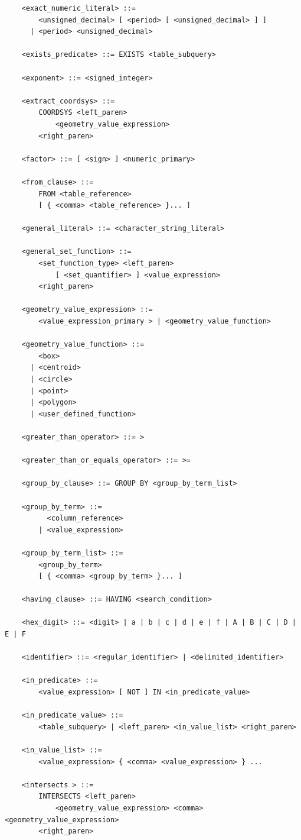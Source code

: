 \documentclass[11pt,a4paper]{ivoa}
\begin{document}
\begin{verbatim}
    <exact_numeric_literal> ::=
        <unsigned_decimal> [ <period> [ <unsigned_decimal> ] ]
      | <period> <unsigned_decimal>

    <exists_predicate> ::= EXISTS <table_subquery>

    <exponent> ::= <signed_integer>

    <extract_coordsys> ::=
        COORDSYS <left_paren>
            <geometry_value_expression>
        <right_paren>

    <factor> ::= [ <sign> ] <numeric_primary>

    <from_clause> ::=
        FROM <table_reference>
	    [ { <comma> <table_reference> }... ]

    <general_literal> ::= <character_string_literal>

    <general_set_function> ::=
        <set_function_type> <left_paren>
            [ <set_quantifier> ] <value_expression>
        <right_paren>

    <geometry_value_expression> ::=
        <value_expression_primary > | <geometry_value_function>

    <geometry_value_function> ::=
        <box>
      | <centroid>
      | <circle>
      | <point>
      | <polygon>
      | <user_defined_function>

    <greater_than_operator> ::= >

    <greater_than_or_equals_operator> ::= >=

    <group_by_clause> ::= GROUP BY <group_by_term_list>

    <group_by_term> ::=
          <column_reference>
        | <value_expression>

    <group_by_term_list> ::=
        <group_by_term>
        [ { <comma> <group_by_term> }... ]

    <having_clause> ::= HAVING <search_condition>

    <hex_digit> ::= <digit> | a | b | c | d | e | f | A | B | C | D | E | F

    <identifier> ::= <regular_identifier> | <delimited_identifier>

    <in_predicate> ::=
        <value_expression> [ NOT ] IN <in_predicate_value>

    <in_predicate_value> ::=
        <table_subquery> | <left_paren> <in_value_list> <right_paren>

    <in_value_list> ::=
        <value_expression> { <comma> <value_expression> } ...

    <intersects > ::=
        INTERSECTS <left_paren>
            <geometry_value_expression> <comma> <geometry_value_expression>
        <right_paren>


\end{verbatim}
\end{document}
